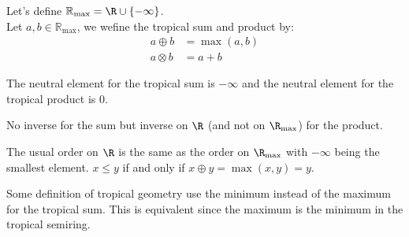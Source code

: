 \documentclass{article}
\begin{document}
\begin{definition}
    Let's define \(\mathbb{R}_{\max}  = \R \cup \{-\infty\} \).\\
    Let \(a, b \in \mathbb{R}_{\max} \), we wefine the tropical sum and product by:
    \begin{align*}
        a \oplus b &= \max(a, b) \\
        a \otimes b &= a + b
    \end{align*}

    The neutral element for the tropical sum is \(-\infty \) and the neutral element for the tropical product is \(0 \).
    
    No inverse for the sum but inverse on \( \R \) (and not on \(\R_{\max} \)) for the product.

    The usual order on \(\R \) is the same as the order on \(\R_{\max} \) with \(-\infty \) being the smallest element.
    $x \leq y$ if and only if $x \oplus y = \max(x, y) = y$.
\end{definition}


\begin{remark}
    Some definition of tropical geometry use the minimum instead of the maximum for the tropical sum. This is equivalent since the maximum is the minimum in the tropical semiring.
\end{remark}
\end{document}
